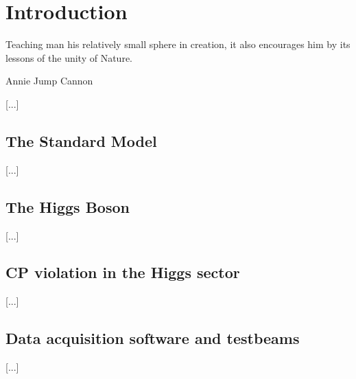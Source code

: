 \chapter{Introduction} 
\label{chapter:intro}

\epigraph{Teaching man his relatively small sphere in creation, it also encourages him by its lessons of the unity of Nature.}{Annie Jump Cannon}{\setlength{\epigraphwidth}{.25\textwidth}}

[...]

\section{The Standard Model}
[...]

\section{The Higgs Boson}
[...]

\section{CP violation in the Higgs sector}
[...]

\section{Data acquisition software and testbeams}
[...]